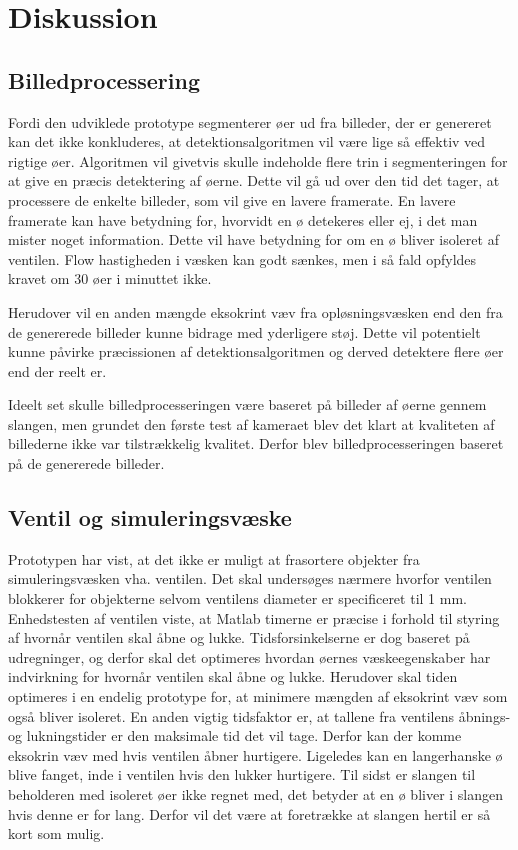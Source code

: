 \chapter{Diskussion}

\section{Billedprocessering}
Fordi den udviklede prototype segmenterer øer ud fra billeder, der er genereret kan det ikke konkluderes, at detektionsalgoritmen vil være lige så effektiv ved rigtige øer. Algoritmen vil givetvis skulle indeholde flere trin i segmenteringen for at give en præcis detektering af øerne. Dette vil gå ud over den tid det tager, at processere de enkelte billeder, som vil give en lavere framerate. En lavere framerate kan have betydning for, hvorvidt en ø detekeres eller ej, i det man mister noget information. Dette vil have betydning for om en ø bliver isoleret af ventilen. Flow hastigheden i væsken kan godt sænkes, men i så fald opfyldes kravet om 30 øer i minuttet ikke.

Herudover vil en anden mængde eksokrint væv fra opløsningsvæsken end den fra de genererede billeder kunne bidrage med yderligere støj. Dette vil potentielt kunne påvirke præcissionen af detektionsalgoritmen og derved detektere flere øer end der reelt er. 

Ideelt set skulle billedprocesseringen være baseret på billeder af øerne gennem slangen, men grundet den første test af kameraet blev det klart at kvaliteten af billederne ikke var tilstrækkelig kvalitet. Derfor blev billedprocesseringen baseret på de genererede billeder. 

\section{Ventil og simuleringsvæske}
Prototypen har vist, at det ikke er muligt at frasortere objekter fra simuleringsvæsken vha. ventilen. Det skal undersøges nærmere hvorfor ventilen blokkerer for objekterne selvom ventilens diameter er specificeret til 1 mm. Enhedstesten af ventilen viste, at Matlab timerne er præcise i forhold til styring af hvornår ventilen skal åbne og lukke. Tidsforsinkelserne er dog baseret på udregninger, og derfor skal det optimeres hvordan øernes væskeegenskaber har indvirkning for hvornår ventilen skal åbne og lukke. Herudover skal tiden optimeres i en endelig prototype for, at minimere mængden af eksokrint væv som også bliver isoleret. En anden vigtig tidsfaktor er, at tallene fra ventilens åbnings- og lukningstider er den maksimale tid det vil tage. Derfor kan der komme eksokrin væv med hvis ventilen åbner hurtigere. Ligeledes kan en langerhanske ø blive fanget, inde i ventilen hvis den lukker hurtigere. Til sidst er slangen til beholderen med isoleret øer ikke regnet med, det betyder at en ø bliver i slangen hvis denne er for lang. Derfor vil det være at foretrække at slangen hertil er så kort som mulig.



